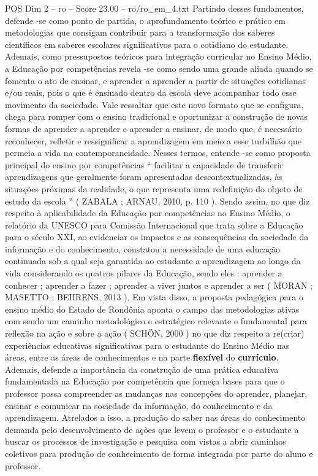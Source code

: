 \begin{textsample}{POS Dim 2 – ro – Score 23.00 – ro/ro\_em\_4.txt}
Partindo desses fundamentos, defende -se como ponto de partida, o aprofundamento teórico e prático em metodologias que consigam contribuir para a transformação dos saberes científicos em saberes escolares significativos para o cotidiano do estudante.
Ademais, como pressupostos teóricos para integração curricular no Ensino Médio, a Educação por competências revela -se como sendo uma grande aliada quando se fomenta o ato de ensinar, e aprender a aprender a partir de situações cotidianas e/ou reais, pois o que é ensinado dentro da escola deve acompanhar todo esse movimento da sociedade.
Vale ressaltar que este novo formato que se configura, chega para romper com o ensino tradicional e oportunizar a construção de novas formas de aprender a aprender e aprender a ensinar, de modo que, é necessário reconhecer, refletir e ressignificar a aprendizagem em meio a esse turbilhão que permeia a vida na contemporaneidade.
Nesses termos, entende -se como proposta principal do ensino por competências “ facilitar a capacidade de transferir aprendizagens que geralmente foram apresentadas descontextualizadas, às situações próximas da realidade, o que representa uma redefinição do objeto de estudo da escola ” ( ZABALA ; ARNAU, 2010, p. 110 ).
Sendo assim, no que diz respeito à aplicabilidade da Educação por competências no Ensino Médio, o relatório da UNESCO para Comissão Internacional que trata sobre a Educação para o século XXI, ao evidenciar os impactos e as consequências da sociedade da informação e do conhecimento, constatou a necessidade de uma educação continuada sob a qual seja garantida ao estudante a aprendizagem ao longo da vida considerando os quatros pilares da Educação, sendo eles : aprender a conhecer ; aprender a fazer ; aprender a viver juntos e aprender a ser ( MORAN ; MASETTO ; BEHRENS, 2013 ).
Em vista disso, a proposta pedagógica para o ensino médio do Estado de Rondônia aponta o campo das metodologias ativas com sendo um caminho metodológico e estratégico relevante e fundamental para reflexão na ação e sobre a ação ( SCHÖN, 2000 ) no que diz respeito a re(criar) experiências educativas significativas para o estudante do Ensino Médio nas áreas, entre as áreas de conhecimentos e na parte \textbf{flexível} do \textbf{currículo}.
Ademais, defende a importância da construção de uma prática educativa fundamentada na Educação por competência que forneça bases para que o professor possa compreender as mudanças nas concepções do aprender, planejar, ensinar e comunicar na sociedade da informação, do conhecimento e da aprendizagem.
Atrelados a isso, a produção do saber nas áreas do conhecimento demanda pelo desenvolvimento de ações que levem o professor e o estudante a buscar os processos de investigação e pesquisa com vistas a abrir caminhos coletivos para produção de conhecimento de forma integrada por parte do aluno e professor.

\end{textsample}
